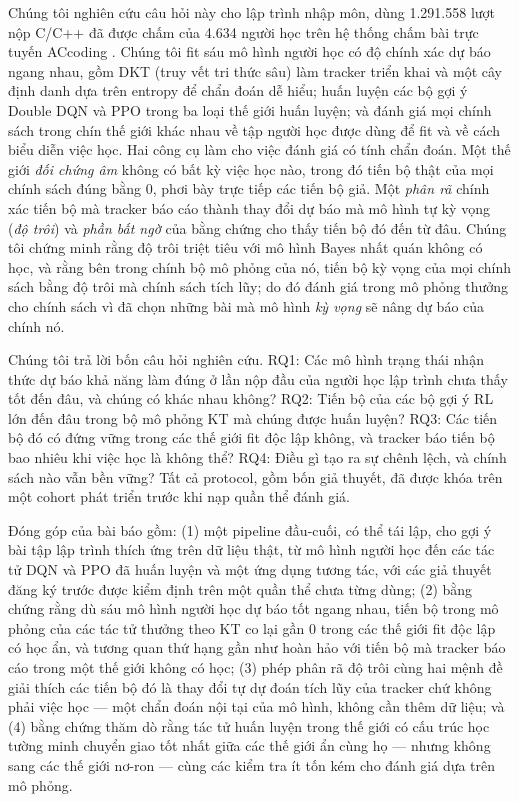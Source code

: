 \documentclass[a4paper,preprint,12pt,authoryear]{elsarticle}
\begin{document}
Chúng tôi nghiên cứu câu hỏi này cho lập trình nhập môn, dùng 1.291.558 lượt nộp C/C++ đã được chấm của 4.634 người học trên hệ thống chấm bài trực tuyến ACcoding \citep{chen2024accoding}. Chúng tôi fit sáu mô hình người học có độ chính xác dự báo ngang nhau, gồm DKT (truy vết tri thức sâu) làm tracker triển khai và một cây định danh dựa trên entropy để chẩn đoán dễ hiểu; huấn luyện các bộ gợi ý Double DQN và PPO trong ba loại thế giới huấn luyện; và đánh giá mọi chính sách trong chín thế giới khác nhau về tập người học được dùng để fit và về cách biểu diễn việc học. Hai công cụ làm cho việc đánh giá có tính chẩn đoán. Một thế giới \emph{đối chứng âm} không có bất kỳ việc học nào, trong đó tiến bộ thật của mọi chính sách đúng bằng 0, phơi bày trực tiếp các tiến bộ giả. Một \emph{phân rã} chính xác tiến bộ mà tracker báo cáo thành thay đổi dự báo mà mô hình tự kỳ vọng (\emph{độ trôi}) và \emph{phần bất ngờ} của bằng chứng cho thấy tiến bộ đó đến từ đâu. Chúng tôi chứng minh rằng độ trôi triệt tiêu với mô hình Bayes nhất quán không có học, và rằng bên trong chính bộ mô phỏng của nó, tiến bộ kỳ vọng của mọi chính sách bằng độ trôi mà chính sách tích lũy; do đó đánh giá trong mô phỏng thưởng cho chính sách vì đã chọn những bài mà mô hình \emph{kỳ vọng} sẽ nâng dự báo của chính nó.

Chúng tôi trả lời bốn câu hỏi nghiên cứu. RQ1: Các mô hình trạng thái nhận thức dự báo khả năng làm đúng ở lần nộp đầu của người học lập trình chưa thấy tốt đến đâu, và chúng có khác nhau không? RQ2: Tiến bộ của các bộ gợi ý RL lớn đến đâu trong bộ mô phỏng KT mà chúng được huấn luyện? RQ3: Các tiến bộ đó có đứng vững trong các thế giới fit độc lập không, và tracker báo tiến bộ bao nhiêu khi việc học là không thể? RQ4: Điều gì tạo ra sự chênh lệch, và chính sách nào vẫn bền vững? Tất cả protocol, gồm bốn giả thuyết, đã được khóa trên một cohort phát triển trước khi nạp quần thể đánh giá.

Đóng góp của bài báo gồm: (1) một pipeline đầu-cuối, có thể tái lập, cho gợi ý bài tập lập trình thích ứng trên dữ liệu thật, từ mô hình người học đến các tác tử DQN và PPO đã huấn luyện và một ứng dụng tương tác, với các giả thuyết đăng ký trước được kiểm định trên một quần thể chưa từng dùng; (2) bằng chứng rằng dù sáu mô hình người học dự báo tốt ngang nhau, tiến bộ trong mô phỏng của các tác tử thưởng theo KT co lại gần 0 trong các thế giới fit độc lập có học ẩn, và tương quan thứ hạng gần như hoàn hảo với tiến bộ mà tracker báo cáo trong một thế giới không có học; (3) phép phân rã độ trôi cùng hai mệnh đề giải thích các tiến bộ đó là thay đổi tự dự đoán tích lũy của tracker chứ không phải việc học — một chẩn đoán nội tại của mô hình, không cần thêm dữ liệu; và (4) bằng chứng thăm dò rằng tác tử huấn luyện trong thế giới có cấu trúc học tường minh chuyển giao tốt nhất giữa các thế giới ẩn cùng họ — nhưng không sang các thế giới nơ-ron — cùng các kiểm tra ít tốn kém cho đánh giá dựa trên mô phỏng.
\end{document}
